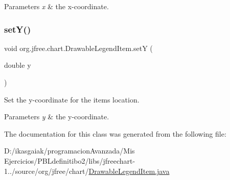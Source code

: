 \begin{DoxyParams}{Parameters}
{\em x} & the x-\/coordinate. \\
\hline
\end{DoxyParams}
\mbox{\label{classorg_1_1jfree_1_1chart_1_1_drawable_legend_item_a9dffae92b78f8994289b2ad61b76e6de}} 
\subsubsection{\texorpdfstring{set\+Y()}{setY()}}
{\footnotesize\ttfamily void org.\+jfree.\+chart.\+Drawable\+Legend\+Item.\+setY (\begin{DoxyParamCaption}\item[{double}]{y }\end{DoxyParamCaption})}

Set the y-\/coordinate for the item\textquotesingle{}s location.


\begin{DoxyParams}{Parameters}
{\em y} & the y-\/coordinate. \\
\hline
\end{DoxyParams}


The documentation for this class was generated from the following file\+:\begin{DoxyCompactItemize}
\item 
D\+:/ikasgaiak/programacion\+Avanzada/\+Mis Ejercicios/\+P\+B\+Ldefinitibo2/libs/jfreechart-\/1../source/org/jfree/chart/\mbox{\hyperlink{_drawable_legend_item_8java}{Drawable\+Legend\+Item.\+java}}\end{DoxyCompactItemize}

